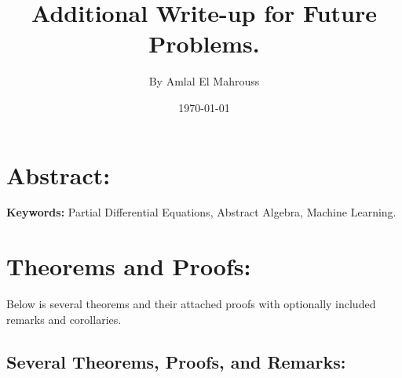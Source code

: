 \documentclass[10pt]{article}
\title{%
	\vspace{-1.5em}%
	\large\textbf{Additional Write-up for Future Problems.}%
}
\author{By Amlal El Mahrouss}
\date{\today}
\theoremstyle{plain}
\theoremstyle{definition}
\theoremstyle{remark}
\begin{document}

\maketitle
\tableofcontents
\newpage

\section{Abstract:}

\textbf{Keywords: } Partial Differential Equations, Abstract Algebra, Machine Learning.

\section{Theorems and Proofs:}

Below is several theorems and their attached proofs with optionally included remarks and corollaries.

\subsection{Several Theorems, Proofs, and Remarks:}
\end{document}
